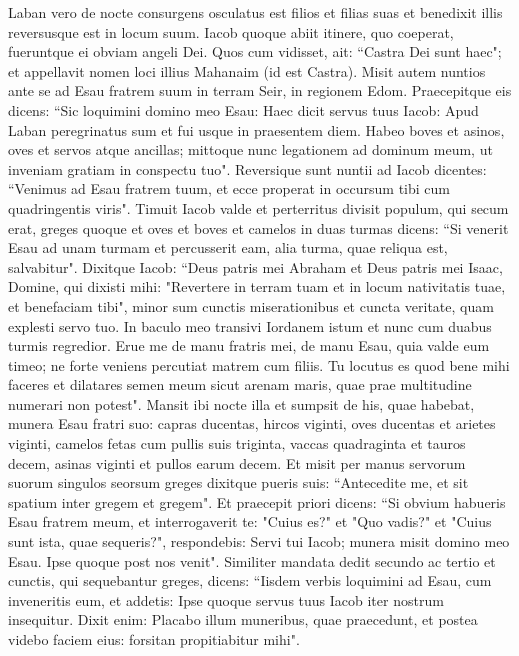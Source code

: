 \begin{biblechapter}  
\verse Laban vero de nocte consurgens osculatus est filios et filias suas et benedixit illis reversusque est in locum suum. 
\verse Iacob quoque abiit itinere, quo coeperat, fueruntque ei obviam angeli Dei.  
\verse Quos cum vidisset, ait: “Castra Dei sunt haec"; et appellavit nomen loci illius Mahanaim (id est Castra). 
\verse Misit autem nuntios ante se ad Esau fratrem suum in terram Seir, in regionem Edom. 
\verse Praecepitque eis dicens: “Sic loquimini domino meo Esau: Haec dicit servus tuus Iacob: Apud Laban peregrinatus sum et fui usque in praesentem diem. 
\verse Habeo boves et asinos, oves et servos atque ancillas; mittoque nunc legationem ad dominum meum, ut inveniam gratiam in conspectu tuo". 
\verse Reversique sunt nuntii ad Iacob dicentes: “Venimus ad Esau fratrem tuum, et ecce properat in occursum tibi cum quadringentis viris". 
\verse Timuit Iacob valde et perterritus divisit populum, qui secum erat, greges quoque et oves et boves et camelos in duas turmas 
\verse dicens: “Si venerit Esau ad unam turmam et percusserit eam, alia turma, quae reliqua est, salvabitur". 
\verse Dixitque Iacob: “Deus patris mei Abraham et Deus patris mei Isaac, Domine, qui dixisti mihi: "Revertere in terram tuam et in locum nativitatis tuae, et benefaciam tibi", 
\verse minor sum cunctis miserationibus et cuncta veritate, quam explesti servo tuo. In baculo meo transivi Iordanem istum et nunc cum duabus turmis regredior. 
\verse Erue me de manu fratris mei, de manu Esau, quia valde eum timeo; ne forte veniens percutiat matrem cum filiis. 
\verse Tu locutus es quod bene mihi faceres et dilatares semen meum sicut arenam maris, quae prae multitudine numerari non potest". 
\verse Mansit ibi nocte illa et sumpsit de his, quae habebat, munera Esau fratri suo: 
\verse capras ducentas, hircos viginti, oves ducentas et arietes viginti,  
\verse camelos fetas cum pullis suis triginta, vaccas quadraginta et tauros decem, asinas viginti et pullos earum decem. 
\verse Et misit per manus servorum suorum singulos seorsum greges dixitque pueris suis: “Antecedite me, et sit spatium inter gregem et gregem". 
\verse Et praecepit priori dicens: “Si obvium habueris Esau fratrem meum, et interrogaverit te: "Cuius es?" et "Quo vadis?" et "Cuius sunt ista, quae sequeris?", 
\verse respondebis: Servi tui Iacob; munera misit domino meo Esau. Ipse quoque post nos venit". 
\verse Similiter mandata dedit secundo ac tertio et cunctis, qui sequebantur greges, dicens: “Iisdem verbis loquimini ad Esau, cum inveneritis eum, 
\verse et addetis: Ipse quoque servus tuus Iacob iter nostrum insequitur. Dixit enim: Placabo illum muneribus, quae praecedunt, et postea videbo faciem eius: forsitan propitiabitur mihi". 

\end{biblechapter}
